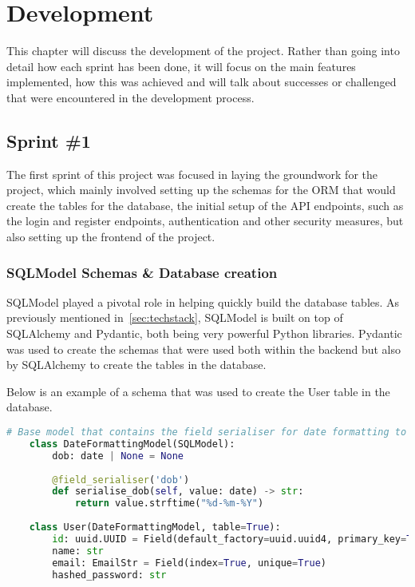 \chapter{Development}

This chapter will discuss the development of the project. Rather than going into detail how each sprint has been done, it will focus on the main features implemented, how this was achieved and will talk about successes or challenged that were encountered in the development process.

\section{Sprint \#1}

The first sprint of this project was focused in laying the groundwork for the project, which mainly involved setting up the schemas for the ORM that would create the tables for the database, the initial setup of the API endpoints, such as the login and register endpoints, authentication and other security measures, but also setting up the frontend of the project.

\subsection{SQLModel Schemas \& Database creation}

SQLModel played a pivotal role in helping quickly build the database tables. As previously mentioned in~\ref{sec:techstack}, SQLModel is built on top of SQLAlchemy and Pydantic, both being very powerful Python libraries. Pydantic was used to create the schemas that were used both within the backend but also by SQLAlchemy to create the tables in the database. 

Below is an example of a schema that was used to create the User table in the database.

\begin{lstlisting}[language=Python, caption=SQLModel User Schema]
# Base model that contains the field serialiser for date formatting to dd-mm-yyyy and the date field itself
    class DateFormattingModel(SQLModel):
        dob: date | None = None
    
        @field_serialiser('dob')
        def serialise_dob(self, value: date) -> str:
            return value.strftime("%d-%m-%Y")
    
    class User(DateFormattingModel, table=True):
        id: uuid.UUID = Field(default_factory=uuid.uuid4, primary_key=True)
        name: str
        email: EmailStr = Field(index=True, unique=True)
        hashed_password: str
\end{lstlisting}

